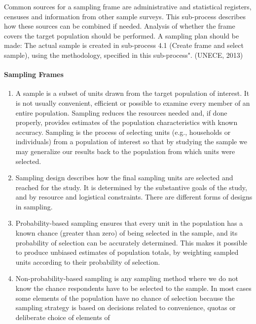 \documentclass[
]{article}
\begin{document}
Common sources for a sampling frame are administrative and statistical
registers, censuses and information from other sample surveys. This
sub-process describes how these sources can be combined if needed.
Analysis of whether the frame covers the target population should be
performed. A sampling plan should be made: The actual sample is created
in sub-process 4.1 (Create frame and select sample), using the
methodology, specified in this sub-process". (UNECE, 2013)

\hypertarget{b.1.-sampling-frames}{%
\paragraph{Sampling Frames}\label{b.1.-sampling-frames}}

\begin{enumerate}
\def\labelenumi{\arabic{enumi}.}
\setcounter{enumi}{130}
\item
  A sample is a subset of units drawn from the target population of
  interest. It is not usually convenient, efficient or possible to
  examine every member of an entire population. Sampling reduces the
  resources needed and, if done properly, provides estimates of the
  population characteristics with known accuracy. Sampling is the
  process of selecting units (e.g., households or individuals) from a
  population of interest so that by studying the sample we may
  generalize our results back to the population from which units were
  selected.
\item
  Sampling design describes how the final sampling units are selected
  and reached for the study. It is determined by the substantive goals
  of the study, and by resource and logistical constraints. There are
  different forms of designs in sampling.
\item
  Probability-based sampling ensures that every unit in the
  population has a known chance (greater than zero) of being selected
  in the sample, and its probability of selection can be accurately
  determined. This makes it possible to produce unbiased estimates of
  population totals, by weighting sampled units according to their
  probability of selection.
\item
  Non-probability-based sampling is any sampling method where we do
  not know the chance respondents have to be selected to the sample.
  In most cases some elements of the population have no chance of
  selection because the sampling strategy is based on decisions
  related to convenience, quotas or deliberate choice of elements of

\end{enumerate}
\end{document}
